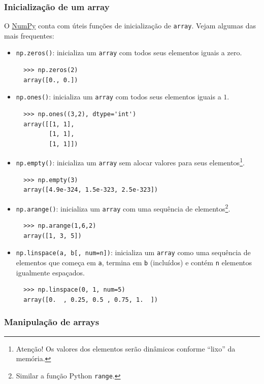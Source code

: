 \documentclass[12pt]{article}
\begin{document}
\subsubsection{Inicialização de um array}\label{subsubsection:iniarray}

O \href{https://numpy.org/}{NumPy} conta com úteis funções de inicialização de \lstinline+array+. Vejam algumas das mais frequentes:
\begin{itemize}
\item \lstinline+np.zeros()+: inicializa um \lstinline+array+ com todos seus elementos iguais a zero.
  \begin{lstlisting}
  >>> np.zeros(2)
  array([0., 0.])
  \end{lstlisting}
\item \lstinline+np.ones()+: inicializa um \lstinline+array+ com todos seus elementos iguais a $1$.
  \begin{lstlisting}
  >>> np.ones((3,2), dtype='int')
  array([[1, 1],
         [1, 1],
         [1, 1]])
  \end{lstlisting}
\item \lstinline+np.empty()+: inicializa um \lstinline+array+ sem alocar valores para seus elementos\footnote{Atenção! Os valores dos elementos serão dinâmicos conforme ``lixo'' da memória.}.
  \begin{lstlisting}
  >>> np.empty(3)
  array([4.9e-324, 1.5e-323, 2.5e-323])
  \end{lstlisting}
\item \lstinline+np.arange()+: inicializa um \lstinline+array+ com uma sequência de elementos\footnote{Similar a função Python \lstinline+range+.}.
  \begin{lstlisting}
  >>> np.arange(1,6,2)
  array([1, 3, 5])
  \end{lstlisting}
\item \lstinline+np.linspace(a, b[, num=n])+: inicializa um \lstinline+array+ como uma sequência de elementos que começa em \lstinline+a+, termina em \lstinline+b+ (incluídos) e contém \lstinline+n+ elementos igualmente espaçados.
  \begin{lstlisting}
  >>> np.linspace(0, 1, num=5)
  array([0.  , 0.25, 0.5 , 0.75, 1.  ])
  \end{lstlisting}
\end{itemize}

\subsubsection{Manipulação de arrays}
\end{document}
